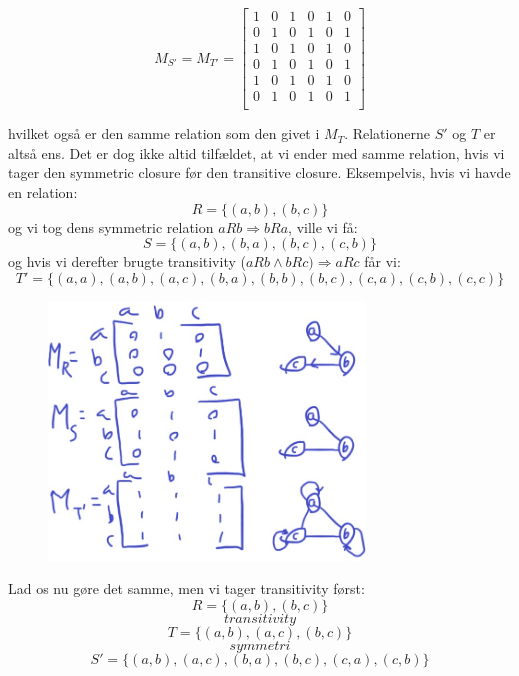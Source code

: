 \documentclass[a4paper,12pt]{article}
\begin{document}
\[M_{S'} = M_{T'} =
\begin{bmatrix}
    1 & 0 & 1 & 0 & 1 & 0 \\
    0 & 1 & 0 & 1 & 0 & 1 \\
    1 & 0 & 1 & 0 & 1 & 0 \\
    0 & 1 & 0 & 1 & 0 & 1 \\
    1 & 0 & 1 & 0 & 1 & 0 \\
    0 & 1 & 0 & 1 & 0 & 1 \\
\end{bmatrix}
\]

hvilket også er den samme relation som den givet i $M_T$. Relationerne $S'$ og $T$ er altså ens.
Det er dog ikke altid tilfældet, at vi ender med samme relation, hvis vi tager den symmetric closure før den transitive closure. Eksempelvis, hvis vi havde en relation:
\[R=\{(a,b),(b,c)\}\]
og vi tog dens symmetric relation $aRb \Rightarrow bRa $, ville vi få:
\[S=\{(a,b),(b,a),(b,c),(c,b)\}\]
og hvis vi derefter brugte transitivity ($aRb \wedge bRc) \Rightarrow aRc$ får vi:
\[T'=\{(a,a),(a,b),(a,c),(b,a),(b,b),(b,c),(c,a),(c,b),(c,c)\}\]

\begin{figure}[H]
    \centering
    \includegraphics[width=0.75\textwidth]{img1.png}
    \caption{}
\end{figure}

Lad os nu gøre det samme, men vi tager transitivity først:
\[R=\{(a,b),(b,c)\}\]
\[transitivity\]
\[T=\{(a,b),(a,c),(b,c)\}\]
\[symmetri\]
\[S'=\{(a,b),(a,c),(b,a),(b,c),(c,a),(c,b)\}\]
\end{document}
